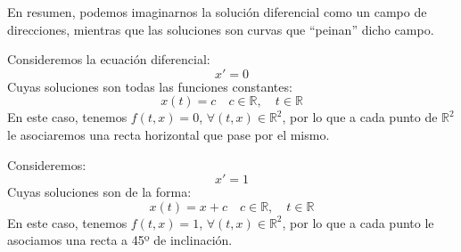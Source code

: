 
En resumen, podemos imaginarnos la solución diferencial como un campo de direcciones, mientras que las soluciones son curvas que ``peinan'' dicho campo.

\begin{ejemplo}
    Consideremos la ecuación diferencial:
    \begin{equation*}
        x' = 0
    \end{equation*}
    Cuyas soluciones son todas las funciones constantes:
    \begin{equation*}
        x(t) = c \quad c\in \mathbb{R}, \quad t\in \mathbb{R}
    \end{equation*}
    En este caso, tenemos $f(t,x)=0$, $\forall (t,x)\in \mathbb{R}^2$, por lo que a cada punto de $\mathbb{R}^2$ le asociaremos una recta horizontal que pase por el mismo.

\end{ejemplo}

\begin{ejemplo}
    Consideremos:
    \begin{equation*}
        x' = 1
    \end{equation*}
    Cuyas soluciones son de la forma:
    \begin{equation*}
        x(t) = x + c \quad c\in \mathbb{R}, \quad t\in \mathbb{R}
    \end{equation*}
    En este caso, tenemos $f(t,x)=1$, $\forall (t,x)\in \mathbb{R}^2$, por lo que a cada punto le asociamos una recta a 45º de inclinación.
\end{ejemplo}

